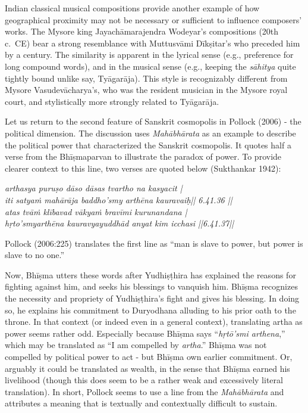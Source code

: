 Indian classical musical compositions provide another example of how geographical proximity may not be necessary or sufficient to influence composers’ works. The Mysore king Jayachāmarajendra Wodeyar’s compositions (20th c.\ CE) bear a strong resemblance with Muttusvāmi Dīkṣitar’s who preceded him by a century. The similarity is apparent in the lyrical sense (e.g., preference for long compound words), and in the musical sense (e.g., keeping the {\sl sāhitya} quite tightly bound unlike say, Tyāgarāja). This style is recognizably different from Mysore Vasudevācharya’s, who was the resident musician in the Mysore royal court, and stylistically more strongly related to Tyāgarāja. 

Let us return to the second feature of Sanskrit cosmopolis in Pollock (2006) - the political dimension. The discussion uses {\sl Mahābhārata} as an example to describe the political power that characterized the Sanskrit cosmopolis. It quotes half a verse from the Bhīṣmaparvan to illustrate the paradox of power. To provide clearer context to this line, two verses are quoted below (Sukthankar 1942):
\begin{myquote}
{\sl arthasya puruṣo dāso dāsas tvartho na kasyacit |\\
iti satyaṁ mahārāja baddho'smy arthēna kauravaiḥ|| 6.41.36 ||\\
atas tvāṁ klībavad vākyaṁ bravīmi kurunandana |\\
hṛto'smyarthēna kauravyayuddhād anyat kim icchasi ||6.41.37||}
\end{myquote}

Pollock (2006:225) translates the first line as “man is slave to power, but power is slave to no one.”

Now, Bhīṣma utters these words after Yudhiṣṭhira has explained the reasons for fighting against him, and seeks his blessings to vanquish him. Bhīṣma recognizes the necessity and propriety of Yudhiṣṭhira’s fight and gives his blessing. In doing so, he explains his commitment to Duryodhana alluding to his prior oath to the throne. In that context (or indeed even in a general context), translating artha as power seems rather odd. Especially because Bhīṣma says “{\sl hṛtō'smi arthena},” which may be translated as “I am compelled by {\sl artha}.” Bhīṣma was not compelled by political power to act - but Bhīṣma own earlier commitment. Or, arguably it could be translated as wealth, in the sense that Bhīṣma earned his livelihood (though this does seem to be a rather weak and excessively literal translation). In short, Pollock seems to use a line from the {\sl Mahābhārata} and attributes a meaning that is textually and contextually difficult to sustain.

